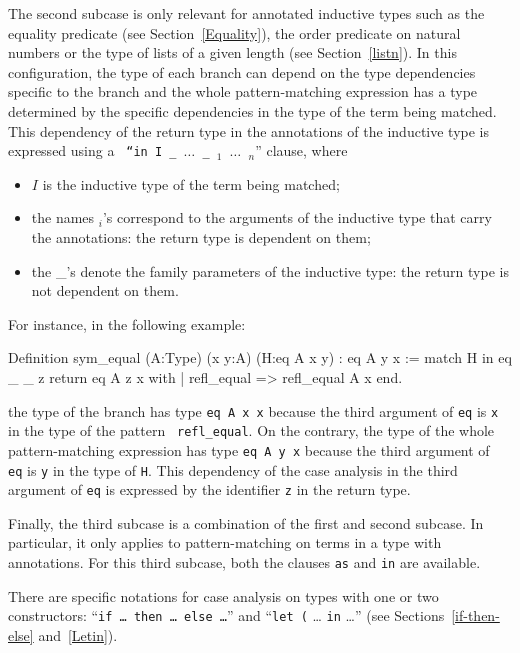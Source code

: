 The second subcase is only relevant for annotated inductive types such
as the equality predicate (see Section~\ref{Equality}), the order
predicate on natural numbers %
or the type of
lists of a given length (see Section~\ref{listn}). In this configuration,
the type of each branch can depend on the type dependencies specific
to the branch and the whole pattern-matching expression has a type
determined by the specific dependencies in the type of the term being
matched. This dependency of the return type in the annotations of the
inductive type is expressed using a {\tt
``in~I~\_~$\ldots$~\_~\ident$_1$~$\ldots$~\ident$_n$}'' clause, where
\begin{itemize}
\item $I$ is the inductive type of the term being matched;

\item the names \ident$_i$'s correspond to the arguments of the
inductive type that carry the annotations: the return type is dependent
on them;

\item the {\_}'s denote the family parameters of the inductive type:
the return type is not dependent on them.
\end{itemize}

For instance, in the following example:
\begin{coq_example*}
Definition sym_equal (A:Type) (x y:A) (H:eq A x y) : eq A y x :=
  match H in eq _ _ z return eq A z x with
  | refl_equal => refl_equal A x
  end.
\end{coq_example*}
the type of the branch has type {\tt eq~A~x~x} because the third
argument of {\tt eq} is {\tt x} in the type of the pattern {\tt
refl\_equal}. On the contrary, the type of the whole pattern-matching
expression has type {\tt eq~A~y~x} because the third argument of {\tt
eq} is {\tt y} in the type of {\tt H}. This dependency of the case
analysis in the third argument of {\tt eq} is expressed by the
identifier {\tt z} in the return type.

Finally, the third subcase is a combination of the first and second
subcase. In particular, it only applies to pattern-matching on terms
in a type with annotations. For this third subcase, both
the clauses {\tt as} and {\tt in} are available.
 
There are specific notations for case analysis on types with one or
two constructors: ``{\tt if {\ldots} then {\ldots} else {\ldots}}''
and ``{\tt let (}\nelist{\ldots}{,}{\tt ) := } {\ldots} {\tt in}
{\ldots}'' (see Sections~\ref{if-then-else} and~\ref{Letin}).

